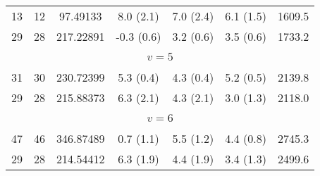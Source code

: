 \begin{table*}[htp]
\begin{tabular}{ccccccc}
 13 & 12 & 97.49133 & 8.0 (2.1) & 7.0 (2.4) & 6.1 (1.5) & 1609.5 \\
 29 & 28 & 217.22891 & -0.3 (0.6) & 3.2 (0.6) & 3.5 (0.6) & 1733.2 \\
&\vspace{-0.75em}\\
\multicolumn{7}{c}{$v = 5$} \\
\vspace{-0.75em}\\
 31 & 30 & 230.72399 & 5.3 (0.4) & 4.3 (0.4) & 5.2 (0.5) & 2139.8 \\
 29 & 28 & 215.88373 & 6.3 (2.1) & 4.3 (2.1) & 3.0 (1.3) & 2118.0 \\
&\vspace{-0.75em}\\
\multicolumn{7}{c}{$v = 6$} \\
\vspace{-0.75em}\\
 47 & 46 & 346.87489 & 0.7 (1.1) & 5.5 (1.2) & 4.4 (0.8) & 2745.3 \\
 29 & 28 & 214.54412 & 6.3 (1.9) & 4.4 (1.9) & 3.4 (1.3) & 2499.6 \\
\hline
\end{tabular}

\par 
\end{table*}
